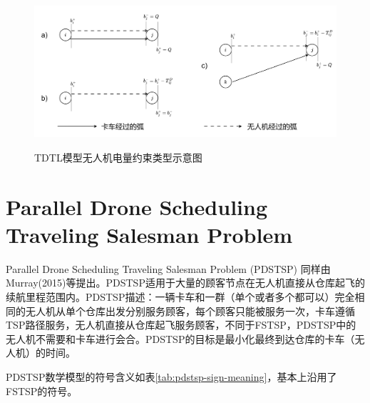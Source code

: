 \begin{figure}[!htb]
    \centering
    \includegraphics[width=\linewidth]{images/tdtl.drawio.png}\\
    \caption{TDTL模型无人机电量约束类型示意图}
    \label{fig:tdtl-drone-battery}
\end{figure}


\section{Parallel Drone Scheduling Traveling Salesman Problem}

Parallel Drone Scheduling Traveling Salesman Problem (PDSTSP) 同样由Murray(2015)等\cite{murrayFlyingSidekickTraveling2015}提出。PDSTSP适用于大量的顾客节点在无人机直接从仓库起飞的续航里程范围内。PDSTSP描述：一辆卡车和一群（单个或者多个都可以）完全相同的无人机从单个仓库出发分别服务顾客，每个顾客只能被服务一次，卡车遵循TSP路径服务，无人机直接从仓库起飞服务顾客，不同于FSTSP，PDSTSP中的无人机不需要和卡车进行会合。PDSTSP的目标是最小化最终到达仓库的卡车（无人机）的时间。

PDSTSP数学模型的符号含义如表\ref{tab:pdstsp-sign-meaning}，基本上沿用了FSTSP的符号。

